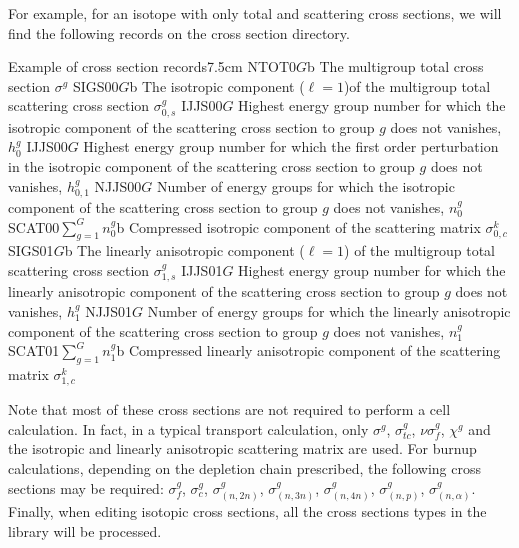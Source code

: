 \vskip 0.2cm

For example, for an isotope with only total and scattering cross sections, we will find the
following records on the cross section directory.

\begin{DescriptionEnregistrement}{Example of cross section records}{7.5cm}
\RealEnr
  {NTOT0}{$G$}{b}
  {The multigroup total cross section $\sigma^{g}$}
\RealEnr
 {SIGS00}{$G$}{b}
 {The isotropic component ($\ell=1$)of the multigroup total scattering cross
  section
  $\sigma_{0,s}^{g}$}
\IntEnr
  {IJJS00}{$G$}
  {Highest energy group number for which 
   the isotropic component of the scattering cross section to group $g$ does not
   vanishes, $h_{0}^{g}$}
\IntEnr
  {IJJS00}{$G$}
  {Highest energy group number for which the first order perturbation in
   the isotropic component of the scattering cross section to group $g$ does not
   vanishes, $h_{0,1}^{g}$}
\IntEnr
  {NJJS00}{$G$}
  {Number of energy groups for which 
   the isotropic component of the scattering cross section to group $g$ does not
   vanishes, $n_{0}^{g}$}
\RealEnr
  {SCAT00}{$\sum_{g=1}^{G} n_{0}^{g}$}{b}
  {Compressed isotropic component of the scattering matrix
   $\sigma_{0,c}^{k}$}
\RealEnr
 {SIGS01}{$G$}{b}
 {The linearly anisotropic component ($\ell=1$) 
  of the multigroup total scattering cross section 
  $\sigma_{1,s}^{g}$}
\IntEnr
  {IJJS01}{$G$}
  {Highest energy group number for which 
   the linearly anisotropic component of the scattering cross section
   to group $g$ does not vanishes,
   $h_{1}^{g}$}
\IntEnr
  {NJJS01}{$G$}
  {Number of energy groups for which 
   the linearly anisotropic component of the scattering cross section 
   to group $g$ does not vanishes,
   $n_{1}^{g}$}
\RealEnr
  {SCAT01}{$\sum_{g=1}^{G} n_{1}^{g}$}{b}
  {Compressed linearly anisotropic component of the scattering matrix
   $\sigma_{1,c}^{k}$}
\end{DescriptionEnregistrement}

Note that most of these cross sections are not required to perform a cell
calculation. In fact, in a typical transport calculation, only
$\sigma^{g}$, $\sigma_{tc}^{g}$, $\nu\sigma_{f}^{g}$, $\chi^{g}$ and the
isotropic and linearly anisotropic scattering matrix are
used. For burnup calculations, depending on the depletion chain prescribed,
the following cross sections may be required:
$\sigma_{f}^{g}$, $\sigma_{c}^{g}$, $\sigma_{(n,2n)}^{g}$, $\sigma_{(n,3n)}^{g}$,
$\sigma_{(n,4n)}^{g}$, $\sigma_{(n,p)}^{g}$, $\sigma_{(n,\alpha)}^{g}$.
Finally, when editing isotopic cross sections, all the cross sections types in
the library will be processed.

